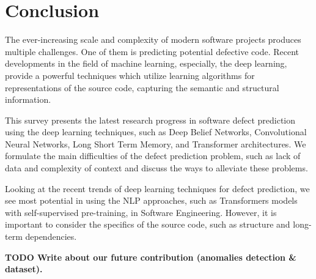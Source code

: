 \documentclass{article}
\begin{document}
\begin{comment}
The proposed approach differs from the mentioned --- it aimed at semantic anomaly detection.
This is provided by the use of semantic representation (\cite{KanadeEtAl2019}, \cite{FengEtAl2020}) and anomaly detection in latent space.


\end{comment}


\section{Conclusion}

The ever-increasing scale and complexity of modern software projects produces multiple challenges. One of them is predicting potential defective code. Recent developments in the field of machine learning, especially, the deep learning, provide a powerful techniques which utilize learning algorithms for representations of the source code, capturing the semantic and structural information. 

This survey presents the latest research progress in software defect prediction using the deep learning techniques, such as Deep Belief Networks, Convolutional Neural Networks, Long Short Term Memory, and Transformer architectures. We formulate the main difficulties of the defect prediction problem, such as lack of data and complexity of context and discuss the ways to alleviate these problems. 

Looking at the recent trends of deep learning techniques for defect prediction, we see most potential in using the NLP approaches, such as Transformers models with self-supervised pre-training, in Software Engineering. However, it is important to consider the specifics of the source code, such as structure and long-term dependencies.

\textbf{TODO Write about our future contribution (anomalies detection \& dataset).}

\printbibliography
\end{document}
